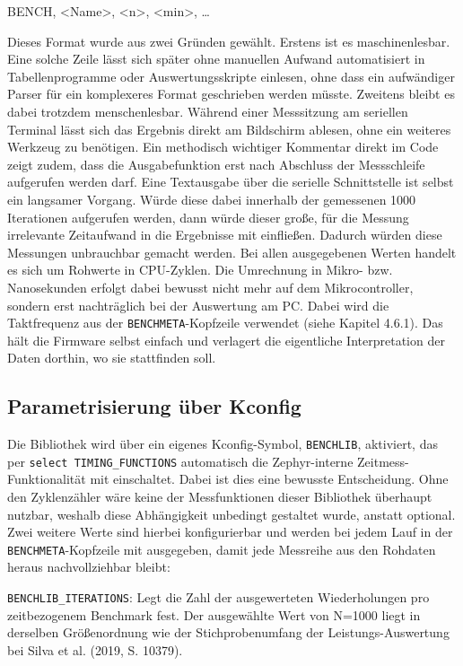 BENCH, <Name>, <n>, <min>, \ldots{}

Dieses Format wurde aus zwei Gr{\"u}nden gew{\"a}hlt. Erstens ist es maschinenlesbar. Eine solche Zeile l{\"a}sst sich sp{\"a}ter ohne manuellen Aufwand automatisiert in Tabellenprogramme oder Auswertungsskripte einlesen, ohne dass ein aufw{\"a}ndiger Parser f{\"u}r ein komplexeres Format geschrieben werden m{\"u}sste. Zweitens bleibt es dabei trotzdem menschenlesbar. W{\"a}hrend einer Messsitzung am seriellen Terminal l{\"a}sst sich das Ergebnis direkt am Bildschirm ablesen, ohne ein weiteres Werkzeug zu ben{\"o}tigen. Ein methodisch wichtiger Kommentar direkt im Code zeigt zudem, dass die Ausgabefunktion erst nach Abschluss der Messschleife aufgerufen werden darf. Eine Textausgabe {\"u}ber die serielle Schnittstelle ist selbst ein langsamer Vorgang. W{\"u}rde diese dabei innerhalb der gemessenen 1000 Iterationen aufgerufen werden, dann w{\"u}rde dieser gro{\ss}e, f{\"u}r die Messung irrelevante Zeitaufwand in die Ergebnisse mit einflie{\ss}en. Dadurch w{\"u}rden diese Messungen unbrauchbar gemacht werden. Bei allen ausgegebenen Werten handelt es sich um Rohwerte in CPU-Zyklen. Die Umrechnung in Mikro- bzw. Nanosekunden erfolgt dabei bewusst nicht mehr auf dem Mikrocontroller, sondern erst nachtr{\"a}glich bei der Auswertung am PC. Dabei wird die Taktfrequenz aus der \lstinline[style=fileinline]|BENCHMETA|-Kopfzeile verwendet (siehe Kapitel 4.6.1). Das h{\"a}lt die Firmware selbst einfach und verlagert die eigentliche Interpretation der Daten dorthin, wo sie stattfinden soll.

\subsection{Parametrisierung {\"u}ber Kconfig}
Die Bibliothek wird {\"u}ber ein eigenes Kconfig-Symbol, \lstinline[style=fileinline]|BENCHLIB|, aktiviert, das per \lstinline[style=fileinline]|select TIMING_FUNCTIONS| automatisch die Zephyr-interne Zeitmess-Funktionalit{\"a}t mit einschaltet. Dabei ist dies eine bewusste Entscheidung. Ohne den Zyklenz{\"a}hler w{\"a}re keine der Messfunktionen dieser Bibliothek {\"u}berhaupt nutzbar, weshalb diese Abh{\"a}ngigkeit unbedingt gestaltet wurde, anstatt optional. Zwei weitere Werte sind hierbei konfigurierbar und werden bei jedem Lauf in der \lstinline[style=fileinline]|BENCHMETA|-Kopfzeile mit ausgegeben, damit jede Messreihe aus den Rohdaten heraus nachvollziehbar bleibt:

\lstinline[style=fileinline]|BENCHLIB_ITERATIONS|: Legt die Zahl der ausgewerteten Wiederholungen pro zeitbezogenem Benchmark fest. Der ausgew{\"a}hlte Wert von N=1000 liegt in derselben Gr{\"o}{\ss}enordnung wie der Stichprobenumfang der Leistungs-Auswertung bei Silva et al. (2019, S. 10379).

